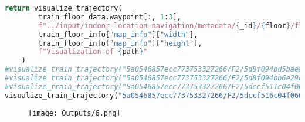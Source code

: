 \documentclass{article}
\begin{document}
\begin{latin}
\begin{lstlisting}[language=Python]
	return visualize_trajectory(
		train_floor_data.waypoint[:, 1:3], 
		f"../input/indoor-location-navigation/metadata/{_id}/{floor}/floor_image.png",
		train_floor_info["map_info"]["width"], 
		train_floor_info["map_info"]["height"],
		f"Visualization of {path}"
	)
#visualize_train_trajectory("5a0546857ecc773753327266/F2/5d8f094bd5bae80006eb8db0.txt")
#visualize_train_trajectory("5a0546857ecc773753327266/F2/5d8f094bb6e29d0006fb8c03.txt")
#visualize_train_trajectory("5a0546857ecc773753327266/F2/5dccf511c04f060006e6e3c6.txt")
visualize_train_trajectory("5a0546857ecc773753327266/F2/5dccf516c04f060006e6e3c9.txt")
\end{lstlisting}
\end{latin}
\begin{figure}[hbt!]
	\centering
	\texttt{[image: Outputs/6.png]}
\end{figure}
\ \\
\end{document}
